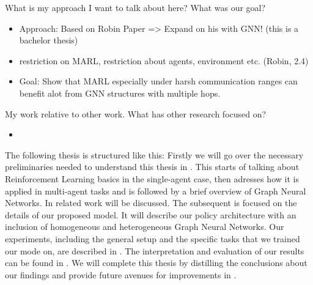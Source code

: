 What is my approach I want to talk about here? What was our goal?
\begin{itemize}[noitemsep,nolistsep]
	\item Approach: Based on Robin Paper => Expand on his with GNN! (this is a bachelor thesis) \citet{RobinRuede2021}
	\item restriction on MARL, restriction about agents, environment etc. (Robin, 2.4)
	\item Goal: Show that MARL especially under harsh communication ranges can benefit alot from GNN structures with multiple hops.
\end{itemize} \par

My work relative to other work. What has other research focused on?
\begin{itemize}[noitemsep,nolistsep]
	\item 
\end{itemize} \par

The following thesis is structured like this: Firstly we will go over the necessary preliminaries needed to understand this thesis in . This starts of talking about Reinforcement Learning basics in the single-agent case, then adresses how it is applied in multi-agent tasks and is followed by a brief overview of Graph Neural Networks. In  related work will be discussed. The subsequent  is focused on the details of our proposed model. It will describe our policy architecture with an inclusion of homogeneous and heterogeneous Graph Neural Networks. Our experiments, including the general setup and the specific tasks that we trained our mode on, are described in . The interpretation and evaluation of our results can be found in . We will complete this thesis by distilling the conclusions about our findings and provide future avenues for improvements in . 